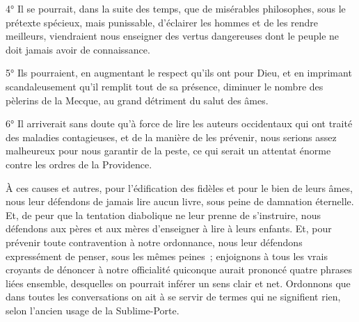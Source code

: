 \documentclass[french,twoside]{book} %
\begin{document}
4° Il se pourrait, dans la suite des temps, que de misérables philosophes, sous le prétexte spécieux, mais punissable, d’éclairer les hommes et de les rendre meilleurs, viendraient nous enseigner des vertus dangereuses dont le peuple ne doit jamais avoir de connaissance.\par
5° Ils pourraient, en augmentant le respect qu’ils ont pour Dieu, et en imprimant scandaleusement qu’il remplit tout de sa présence, diminuer le nombre des pèlerins de la Mecque, au grand détriment du salut des âmes.\par
6° Il arriverait sans doute qu’à force de lire les auteurs occidentaux qui ont traité des maladies contagieuses, et de la manière de les prévenir, nous serions assez malheureux pour nous garantir de la peste, ce qui serait un attentat énorme contre les ordres de la Providence.\par
À ces causes et autres, pour l’édification des fidèles et pour le bien de leurs âmes, nous leur défendons de jamais lire aucun livre, sous peine de damnation éternelle. Et, de peur que la tentation diabolique ne leur prenne de s’instruire, nous défendons aux pères et aux mères d’enseigner à lire à leurs enfants. Et, pour prévenir toute contravention à notre ordonnance, nous leur défendons expressément de penser, sous les mêmes peines ; enjoignons à tous les vrais croyants de dénoncer à notre officialité quiconque aurait prononcé quatre phrases liées ensemble, desquelles on pourrait inférer un sens clair et net. Ordonnons que dans toutes les conversations on ait à se servir de termes qui ne signifient rien, selon l’ancien usage de la Sublime-Porte.\par
\end{document}
